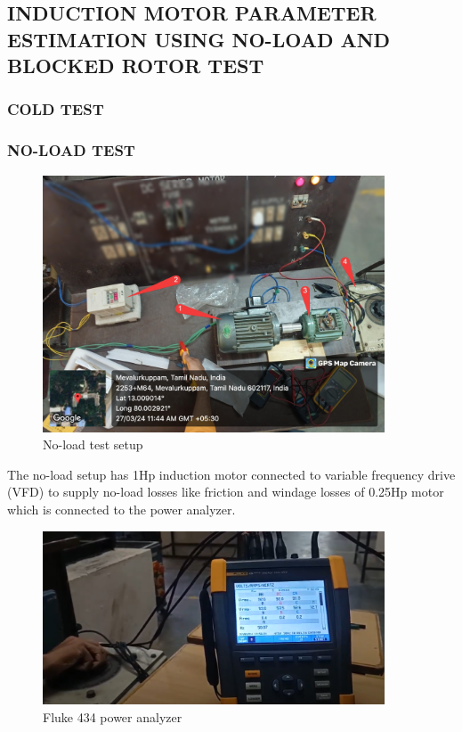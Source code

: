 \subsection{INDUCTION MOTOR PARAMETER ESTIMATION USING NO-LOAD AND BLOCKED ROTOR TEST}


\subsubsection{COLD TEST}

\subsubsection{NO-LOAD TEST}


\begin{figure}
	\centering
	\includegraphics[width=4in]{sections/section5/images/ParamEstim/SetupNoload.jpg}
	\caption{No-load test setup}
	\label{fig:no_load_test_setup}
\end{figure}

The no-load setup has 1Hp induction motor connected to variable frequency drive (VFD) to supply no-load losses like friction and windage losses of 0.25Hp motor which is connected to the power analyzer.



\begin{figure}[H]
	\centering
	\includegraphics[width=4in]{sections/section5/images/ParamEstim/FlukeVoltAmpHertz.png}
	\caption{Fluke 434 power analyzer}
	\label{fig:fluke434}
\end{figure}

